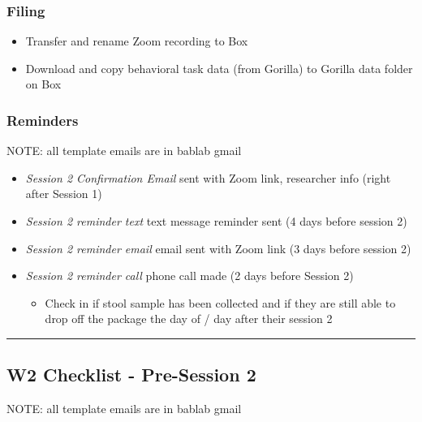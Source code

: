 \documentclass[]{book}
\providecommand{\tightlist}{%
  \setlength{\itemsep}{0pt}\setlength{\parskip}{0pt}}
\begin{document}
\hypertarget{filing-5}{%
\subsubsection{Filing}\label{filing-5}}

\begin{itemize}
\tightlist
\item
  Transfer and rename Zoom recording to Box
\item
  Download and copy behavioral task data (from Gorilla) to Gorilla data folder on Box
\end{itemize}

\hypertarget{reminders-3}{%
\subsubsection{Reminders}\label{reminders-3}}

NOTE: all template emails are in bablab gmail

\begin{itemize}
\tightlist
\item
  \emph{Session 2 Confirmation Email} sent with Zoom link, researcher info (right after Session 1)
\item
  \emph{Session 2 reminder text} text message reminder sent (4 days before session 2)
\item
  \emph{Session 2 reminder email} email sent with Zoom link (3 days before session 2)
\item
  \emph{Session 2 reminder call} phone call made (2 days before Session 2)

  \begin{itemize}
  \tightlist
  \item
    Check in if stool sample has been collected and if they are still able to drop off the package the day of / day after their session 2
  \end{itemize}
\end{itemize}

\begin{center}\rule{0.5\linewidth}{0.5pt}\end{center}

\hypertarget{w2-checklist---pre-session-2}{%
\subsection{W2 Checklist - Pre-Session 2}\label{w2-checklist---pre-session-2}}

NOTE: all template emails are in bablab gmail
\end{document}
